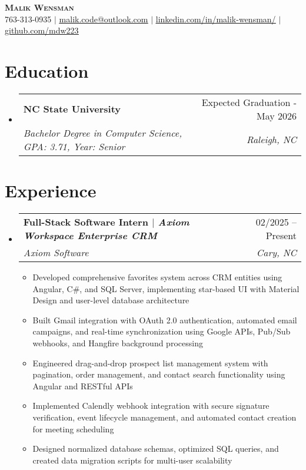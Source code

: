 \documentclass[letterpaper,11pt]{article}
\makeatletter
\newcommand{\resumeItem}[1]{
  \item\small{
    {#1 \vspace{-2pt}}
  }
}
\newcommand{\resumeSubheading}[4]{
  \vspace{-2pt}\item
    \begin{tabular*}{0.97\textwidth}[t]{l@{\extracolsep{\fill}}r}
      \textbf{#1} & #2 \\
      \textit{\small#3} & \textit{\small #4} \\
    \end{tabular*}\vspace{-7pt}
}
\newcommand{\resumeSubHeadingListStart}{\begin{itemize}[leftmargin=0.15in, label={}]}
\newcommand{\resumeSubHeadingListEnd}{\end{itemize}}
\newcommand{\resumeItemListStart}{\begin{itemize}}
\newcommand{\resumeItemListEnd}{\end{itemize}\vspace{-5pt}}
\makeatother
\begin{document}

\begin{center}
    \textbf{\Huge \scshape Malik Wensman} \\ \vspace{1pt}
    \small 763-313-0935 $|$ \href{mailto:malik.code@outlook.com}{\underline{malik.code@outlook.com}} $|$ 
    \href{https://www.linkedin.com/in/malik-wensman/}{\underline{linkedin.com/in/malik-wensman/}} $|$
    \href{https://github.com/mdw223}{\underline{github.com/mdw223}}
\end{center}


\section{Education}
  \resumeSubHeadingListStart
    \resumeSubheading
      {NC State University}{Expected Graduation - May 2026}
      {Bachelor Degree in Computer Science, GPA: 3.71, Year: Senior}{Raleigh, NC}
  \resumeSubHeadingListEnd

\section{Experience}
  \resumeSubHeadingListStart
    \resumeSubheading
      {\textbf{Full-Stack Software Intern} $|$ \emph{Axiom Workspace Enterprise CRM}}
      {02/2025 – Present}
      {Axiom Software}{Cary, NC}
      \resumeItemListStart
        \resumeItem{Developed comprehensive favorites system across CRM entities using Angular, C\#, and SQL Server, implementing star-based UI with Material Design and user-level database architecture}
        \resumeItem{Built Gmail integration with OAuth 2.0 authentication, automated email campaigns, and real-time synchronization using Google APIs, Pub/Sub webhooks, and Hangfire background processing}
        \resumeItem{Engineered drag-and-drop prospect list management system with pagination, order management, and contact search functionality using Angular and RESTful APIs}
        \resumeItem{Implemented Calendly webhook integration with secure signature verification, event lifecycle management, and automated contact creation for meeting scheduling}
        \resumeItem{Designed normalized database schemas, optimized SQL queries, and created data migration scripts for multi-user scalability}
    \resumeItemListEnd
  \resumeSubHeadingListEnd
\end{document}
